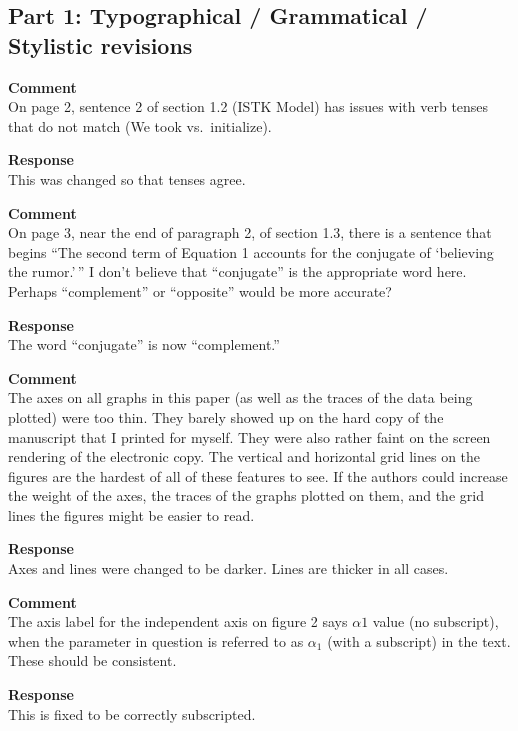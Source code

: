 \subsection{Part 1: Typographical / Grammatical / Stylistic revisions}
\setcounter{rev1-part1}{1}

\textbf{Comment } \\
On page 2, sentence 2 of section 1.2 (ISTK Model) has issues with verb tenses that do not match (We took vs.\ initialize).

\textbf{Response } \\
This was changed so that tenses agree.

\textbf{Comment } \\
On page 3, near the end of paragraph 2, of section 1.3, there is a sentence that begins ``The second term of Equation 1 accounts for the conjugate of `believing the rumor.'\,'' I don't believe that ``conjugate'' is the appropriate word here. Perhaps ``complement'' or ``opposite'' would be more accurate?

\textbf{Response } \\
The word ``conjugate'' is now ``complement.''

\textbf{Comment } \\
The axes on all graphs in this paper (as well as the traces of the data being plotted) were too thin.
They barely showed up on the hard copy of the manuscript that I printed for myself.
They were also rather faint on the screen rendering of the electronic copy.
The vertical and horizontal grid lines on the figures are the hardest of all of these features to see.
If the authors could increase the weight of the axes, the traces of the graphs plotted on them, and the grid lines the figures might be easier to read.

\textbf{Response } \\
Axes and lines were changed to be darker. Lines are thicker in all cases.

\textbf{Comment } \\
The axis label for the independent axis on figure 2 says $ \alpha 1 $ value (no subscript), when the parameter in question is referred to as $ \alpha_1 $ (with a subscript) in the text.
These should be consistent.

\textbf{Response } \\
This is fixed to be correctly subscripted.
